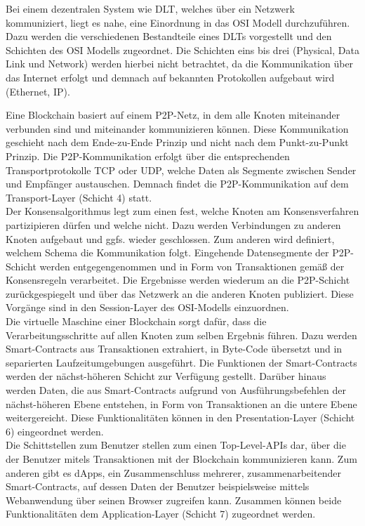 Bei einem dezentralen System wie \ac{DLT}, welches über ein Netzwerk kommuniziert, liegt es nahe, eine Einordnung in das \ac{OSI} Modell durchzuführen. Dazu werden die verschiedenen Bestandteile eines \ac{DLT}s vorgestellt und den Schichten des \ac{OSI} Modells zugeordnet. Die Schichten eins bis drei (Physical, Data Link und Network) werden hierbei nicht betrachtet, da die Kommunikation über das Internet erfolgt und demnach auf bekannten Protokollen aufgebaut wird (Ethernet, IP).

Eine Blockchain basiert auf einem \ac{P2P}-Netz, in dem alle Knoten miteinander verbunden sind und miteinander kommunizieren können. Diese Kommunikation geschieht nach dem Ende-zu-Ende Prinzip und nicht nach dem Punkt-zu-Punkt Prinzip. Die \ac{P2P}-Kommunikation erfolgt über die entsprechenden Transportprotokolle TCP oder UDP, welche Daten als Segmente zwischen Sender und Empfänger austauschen. Demnach findet die \ac{P2P}-Kommunikation auf dem Transport-Layer (Schicht 4) statt.\\
Der Konsensalgorithmus legt zum einen fest, welche Knoten am Konsensverfahren partizipieren dürfen und welche nicht. Dazu werden Verbindungen zu anderen Knoten aufgebaut und ggfs. wieder geschlossen. Zum anderen wird definiert, welchem Schema die Kommunikation folgt. Eingehende Datensegmente der \ac{P2P}-Schicht werden entgegengenommen und in Form von Transaktionen gemäß der Konsensregeln verarbeitet. Die Ergebnisse werden wiederum an die \ac{P2P}-Schicht zurückgespiegelt und über das Netzwerk an die anderen Knoten publiziert. Diese Vorgänge sind in den Session-Layer des \ac{OSI}-Modells einzuordnen.\\
Die virtuelle Maschine einer Blockchain sorgt dafür, dass die Verarbeitungsschritte auf allen Knoten zum selben Ergebnis führen. Dazu werden Smart-Contracts aus Transaktionen extrahiert, in Byte-Code übersetzt und in separierten Laufzeitumgebungen ausgeführt. Die Funktionen der Smart-Contracts werden der nächst-höheren Schicht zur Verfügung gestellt. Darüber hinaus werden Daten, die aus Smart-Contracts aufgrund von Ausführungsbefehlen der nächst-höheren Ebene entstehen, in Form von Transaktionen an die untere Ebene weitergereicht. Diese Funktionalitäten können in den Presentation-Layer (Schicht 6) eingeordnet werden.\\
Die Schittstellen zum Benutzer stellen zum einen Top-Level-\ac{API}s dar, über die der Benutzer mitels Transaktionen mit der Blockchain kommunizieren kann. Zum anderen gibt es dApps, ein Zusammenschluss mehrerer, zusammenarbeitender Smart-Contracts, auf dessen Daten der Benutzer beispielsweise mittels Webanwendung über seinen Browser zugreifen kann. Zusammen können beide Funktionalitäten dem Application-Layer (Schicht 7) zugeordnet werden.\\

